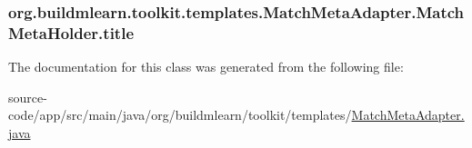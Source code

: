 \subsubsection[{\texorpdfstring{title}{title}}]{ org.\+buildmlearn.\+toolkit.\+templates.\+Match\+Meta\+Adapter.\+Match\+Meta\+Holder.\+title}\hypertarget{classorg_1_1buildmlearn_1_1toolkit_1_1templates_1_1MatchMetaAdapter_1_1MatchMetaHolder_ac796e46f5bb18dd6f1dc765e56ae63f1}{}\label{classorg_1_1buildmlearn_1_1toolkit_1_1templates_1_1MatchMetaAdapter_1_1MatchMetaHolder_ac796e46f5bb18dd6f1dc765e56ae63f1}


The documentation for this class was generated from the following file\+:\begin{DoxyCompactItemize}
\item 
source-\/code/app/src/main/java/org/buildmlearn/toolkit/templates/\hyperlink{MatchMetaAdapter_8java}{Match\+Meta\+Adapter.\+java}\end{DoxyCompactItemize}
